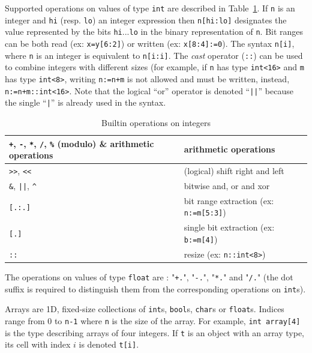 \medskip
\step Supported operations on values of type \texttt{int} are described in Table~\ref{tab:int-ops}.
If \verb|n| is an integer and \verb|hi| (resp. \verb|lo|) an integer expression then \verb|n[hi:lo]|
designates the value represented by the bits \verb|hi|...\verb|lo| in the binary representation of
\verb|n|. Bit ranges can be both read (ex: \verb|x=y[6:2]|) or written (ex: \verb|x[8:4]:=0|). The
syntax \verb|n[i]|, where \verb|n| is an integer is equivalent to \verb|n[i:i]|. The \emph{cast}
operator (\verb|::|) can be used to combine integers with different sizes (for example, if \verb|n|
has type \verb|int<16>| and \verb|m| has type \verb|int<8>|, writing \verb|n:=n+m| is not allowed
and must be written, instead, \verb|n:=n+m::int<16>|. Note that the
logical ``or'' operator is denoted ``\verb+||+'' because the single ``\verb+|+'' is already used in
the syntax.

\begin{table}[h]
\begin{center}
\begin{tabular}{|l|l|} \hline
\verb|+|, \verb|-|, \verb|*|, \verb|/|, \verb|%| (modulo) & arithmetic operations \\ \hline 
\verb|>>|, \verb|<<| & (logical) shift right and left \\ \hline 
\verb|&|, \verb+||+, \verb|^| & bitwise and, or and xor \\ \hline 
\verb|[.:.]| & bit range extraction (ex: \verb|n:=m[5:3]|) \\ \hline 
\verb|[.]| & single bit extraction (ex: \verb|b:=m[4]|) \\ \hline 
\verb|::| & resize (ex: \verb|n::int<8>|) \\ \hline 
\end{tabular}
\caption{\label{tab:int-ops}Builtin operations on integers}
\end{center}
\end{table}

\medskip
\step The operations on values of type \texttt{float} are : "\verb|+.|", "\verb|-.|", "\verb|*.|" and
"\verb|/.|" (the dot suffix is required to distinguish them from the corresponding operations on
\texttt{int}s).

\medskip
\step Arrays are 1D, fixed-size collections of \verb|int|s, \verb|bool|s, \verb|char|s or \verb|float|s. Indices
range from 0 to \verb|n-1| where \verb|n| is the size of the array. For example,
 \verb|int array[4]| is the type describing arrays of four integers. If \verb|t| is an object
  with an array type, its cell with index $i$ is denoted \verb|t[i]|.

